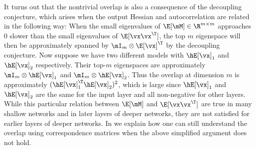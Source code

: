 It turns out that the nontrivial overlap is also a consequence of the decoupling conjecture, which arises when the output Hessian and autocorrelation are related in the following way: When the small eigenvalues of $\E[\mM]\in\R^{m\times m}$ approaches 0 slower than the small eigenvalues of $\E[\vx\vx^\T]$, the top $m$ eigenspace will then be approximately spanned by $\mI_m\otimes \E[\vx]^\T$ by the decoupling conjecture.
Now suppose we have two different models with $\hE[\vx]_1$ and $\hE[\vx]_2$ respectively. Their top-$m$ eigenspaces are approximately $\mI_m \otimes \hE[\vx]_1$ and $\mI_m \otimes \hE[\vx]_2$. Thus the overlap at dimension $m$ is approximately $(\hE[\vx]_1^\T \hE[\vx]_2)^2$, which is large since $\hE[\vx]_1$ and $\hE[\vx]_2$ are the same for the input layer and all non-negative for other layers.
While this particular relation between $\E[\mM]$ and $\E[\vx\vx^\T]$ are true in many shallow networks and in later layers of deeper networks, they are not satisfied for earlier layers of deeper networks.  In  we explain how one can still understand the overlap using correspondence matrices when the above simplified argument does not hold. %




